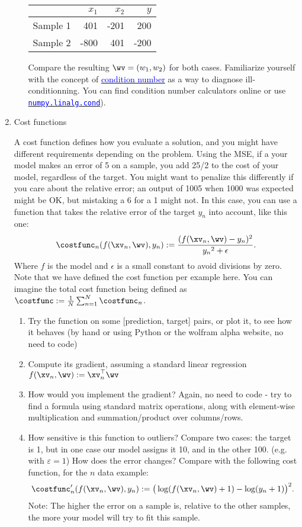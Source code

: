 \documentclass{../tex_import/ETHuebung_english}
\begin{document}
\begin{enumerate}
\begin{enumerate}
			\begin{center}
				\begin{tabular}{r|rrr}
					          & $x_1$ & $x_2$ &  $y$	\\
					\hline
					Sample 1  &   401 &  -201 &  200	\\
					Sample 2  &  -800 &   401 & -200	\\
				\end{tabular}
			\end{center}

			Compare the resulting $\wv=(w_1,w_2)$ for both cases. Familiarize yourself with the concept of \href{https://en.wikipedia.org/wiki/Condition_number}{\textcolor{blue}{condition number}} as a way to diagnose ill-conditionning. You can find condition number calculators online or use \href{http://docs.scipy.org/doc/numpy-1.10.1/reference/generated/numpy.linalg.cond.html}{\textcolor{blue}{\texttt{numpy.linalg.cond}}}).
  \end{enumerate}

	\item Cost functions

	A cost function defines how you evaluate a solution, and you might have different requirements depending on the problem.
	Using the MSE, if a your model makes an error of 5 on a sample, you add 25/2 to the cost of your model, regardless of the target.
	You might want to penalize this differently if you care about the relative error;
	an output of 1005 when 1000 was expected might be OK, but mistaking a 6 for a 1 might not.
	In this case, you can use a function that takes the relative error of the target $y_n$ into account, like this one:
	\[
	\costfunc_n(f(\xv_n,\wv), y_n) := \frac{(f(\xv_n,\wv) - y_n)^2}{{y_n}^2 + \epsilon}.
	\]
	Where $f$ is the model and $\epsilon$ is a small constant to avoid divisions by zero. Note that we have defined the cost function per example here. You can imagine the total cost function being defined as $\costfunc:=\frac1N\sum_{n=1}^N\costfunc_n$.
  \begin{enumerate}
	  \item Try the function on some [prediction, target] pairs, or plot it, to see how it behaves (by hand or using Python or the wolfram alpha website, no need to code)
  	\item Compute its gradient, assuming a standard linear regression $f(\xv_n, \wv) := \xv_n^\top \wv$
  	\item How would you implement the gradient? Again, no need to code - try to find a formula using standard matrix operations, along with element-wise multiplication and summation/product over columns/rows.
  	\item How sensitive is this function to outliers? Compare two cases: the target is 1, but in one case our model assigns it 10, and in the other 100. (e.g. with $\varepsilon = 1$) How does the error changes? Compare with the following cost function, for the $n$ data example:
  	\[	\costfunc'_n(f(\xv_n,\wv), y_n) := \big(\log(f(\xv_n,\wv)+1) - \log(y_n + 1)\big)^2.	\]
  	Note: The higher the error on a sample is, relative to the other samples, the more your model will try to fit this sample.
  \end{enumerate}
\end{enumerate}
\end{document}
